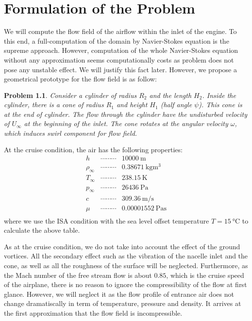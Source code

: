 \documentclass[12pt]{book}
\theoremstyle{bfnote}
\theoremstyle{bfnote}
\newtheorem{problem}{Problem}[chapter]
\begin{document}
\chapter{Formulation of the Problem} %
\label{chap:Formulation_of_the_Problem}

We will compute the flow field of the airflow within the inlet of the engine. To this end, a full-computation of the domain by Navier-Stokes equation is the supreme approach. However, computation of the whole Navier-Stokes equation without any approximation seems computationally costs as problem does not pose any unstable effect. We will justify this fact later. However, we propose a geometrical prototype for the flow field is as follow:

\begin{problem}
    Consider a cylinder of radius $R_2$ and the length $H_2$. Inside the cylinder, there is a cone of radius $R_1$ and height $H_1$ (half angle $\psi$). This cone is at the end of cylinder. The flow through the cylinder have the undisturbed velocity of $U_{\infty}$ at the beginning of the inlet. The cone rotates at the angular velocity $\omega$, which induces swirl component for flow field.
\end{problem}


At the cruise condition, the air has the following properties:
\[
\begin{array}{lcl}
    h & \cdots\cdots\cdots & \SI{10000}{\meter} \\
    \rho_\infty & \cdots\cdots\cdots & \SI{0.38671}{\kilogram\cubic\meter} \\
    T_\infty & \cdots\cdots\cdots & \SI{238.15}{\kelvin} \\
    p_\infty & \cdots\cdots\cdots & \SI{26436}{\pascal} \\
    c & \cdots\cdots\cdots & \SI{309.36}{\meter\per\second} \\
    \mu & \cdots\cdots\cdots & \SI{0.00001552}{\pascal\second} \\
\end{array}
\]
where we use the ISA condition with the sea level offset temperature $T = \SI{15}{\degreeCelsius}$ to calculate the above table.

As at the cruise condition, we do not take into account the effect of the ground vortices. All the secondary effect such as the vibration of the nacelle inlet and the cone, as well as all the roughness of the surface will be neglected. Furthermore, as the Mach number of the free stream flow is about $0.85$, which is the cruise speed of the airplane, there is no reason to ignore the compressibility of the flow at first glance. However, we will neglect it as the flow profile of entrance air does not change dramatiscally in term of temperature, pressure and density. It arrives at the first approximation that the flow field is incompressible.
\end{document}
